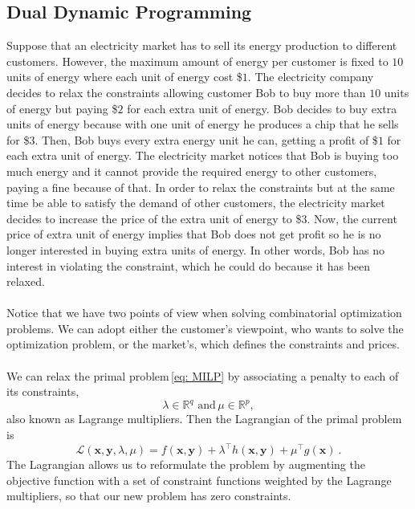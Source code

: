 \subsection{Dual Dynamic Programming}
Suppose that an electricity market has to sell its energy production to different customers. However, the maximum amount of energy per customer is fixed to $10$ units of energy where each unit of energy cost \$$1$. The electricity company decides to relax the constraints allowing customer Bob to buy more than $10$ units of energy but paying \$$2$ for each extra unit of energy. Bob decides to buy extra units of energy because with one unit of energy he produces a chip that he sells for \$$3$. Then, Bob buys every extra energy unit he can, getting a profit of \$$1$ for each extra unit of energy. The electricity market notices that Bob is buying too much energy and it cannot provide the required energy to other customers, paying a fine because of that. In order to relax the constraints but at the same time be able to satisfy the demand of other customers, the electricity market decides to increase the price of the extra unit of energy to \$$3$. Now, the current price of extra unit of energy implies that Bob does not get profit so he is no longer interested in buying extra units of energy. In other words, Bob has no interest in violating the constraint, which he could do because it has been relaxed.\\\\
Notice that we have two points of view when solving combinatorial optimization problems. We can adopt either the customer's viewpoint, who wants to solve the optimization problem, or the market's, which defines the constraints and prices.\\\\
We can relax the primal problem\,\eqref{eq: MILP} by associating a penalty to each of its constraints,
\begin{equation}
    \lambda\in\mathbb{R}^{q}\,\, \textrm{and} \, \mu\in\mathbb{R}^{p},
\end{equation}
also known as Lagrange multipliers. Then the Lagrangian of the primal problem is
\begin{equation}
    \mathcal{L}(\mathbf{x},\mathbf{y}, \lambda, \mu) = f(\mathbf{x}, \mathbf{y}) + \lambda^{\intercal}h(\mathbf{x},\mathbf{y}) + \mu^{\intercal}g(\mathbf{x})\ .
\end{equation}
The Lagrangian allows us to reformulate the problem by augmenting the objective function with a set of constraint functions weighted by the Lagrange multipliers, so that our new problem has zero constraints.
